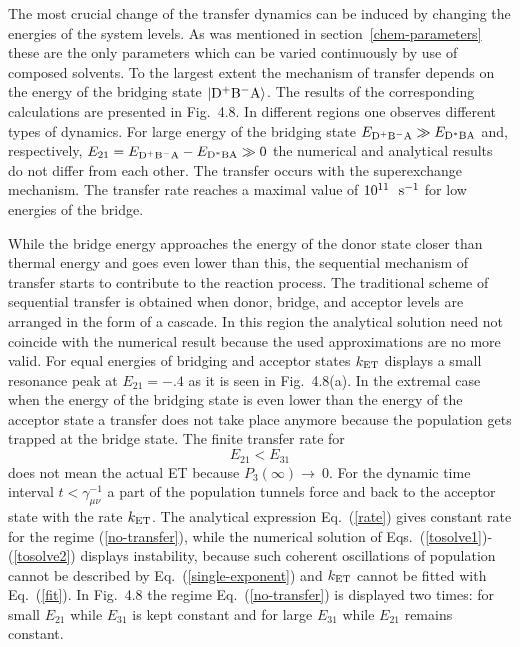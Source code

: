 \documentclass[12pt,twoside,a4paper]{report}
\begin{document}
The most crucial change of the transfer dynamics can be 
induced by  changing  the  energies of the system levels.  
As was mentioned  in  section~\ref{chem-parameters} 
these are the only parameters which can be varied continuously 
by use of composed solvents.  
To the largest extent the mechanism of transfer depends 
on the energy of the bridging state 
$\left| {\rm D^+B^-A} \right>$. The results of the corresponding  
calculations are presented in Fig.~4.8.
In different regions one observes 
different types of dynamics. 
For large energy of the bridging state  
$E_{\rm D^+B^-A} \gg{}E_{\rm D^*BA}$ and, respectively, 
$E_{21}=E_{\rm D^+B^-A}-E_{\rm D^*BA} \gg{}0$ 
the numerical and analytical results do not differ  
from each other. 
The transfer occurs with the superexchange mechanism. 
The transfer rate  
reaches a maximal value of $10^{11}~ ~{\rm s}^{-1}$
for low energies of the bridge. 

 
While the bridge energy approaches the energy of the donor state 
closer than thermal energy
and goes even lower than this,
the sequential mechanism of transfer starts to contribute to the   
reaction process. 
The traditional scheme of sequential transfer is obtained
when donor, bridge, and acceptor levels are arranged in the form
of a cascade.
In this region the analytical solution need not coincide 
with the numerical result 
because the used approximations are no more valid. 
For equal energies of bridging and acceptor states $k_{\rm ET}$ displays
a small resonance peak at $E_{21}=-.4$ as it is seen in Fig.~4.8(a).
In the extremal case when the energy of the bridging state  
is even lower than the energy of the acceptor state 
a transfer does not take place anymore
because the population gets trapped at the bridge state.
The finite transfer rate for 
\begin{equation}
\label{no-transfer}
E_{21}<E_{31}
\end{equation}
does not mean the actual ET because $P_3(\infty)\rightarrow~0$.
For the dynamic time interval $t<\gamma_{ \mu \nu }^{-1}$
a part of the population tunnels force and back to the acceptor state with the rate $k_{\rm ET}$.
The analytical expression Eq.~(\ref{rate}) gives constant rate for the regime (\ref{no-transfer}),
while the numerical solution of Eqs.~(\ref{tosolve1})-(\ref{tosolve2}) displays instability, 
because such coherent oscillations of population cannot be
described by 
Eq.~(\ref{single-exponent})
and $k_{\rm ET}$ cannot be fitted with Eq.~(\ref{fit}).
In Fig.~4.8
the regime Eq.~(\ref{no-transfer}) is displayed two times:
for small $E_{21}$ while $E_{31}$ is kept  constant
and for large $E_{31}$ while $E_{21}$ remains constant.
\end{document}
